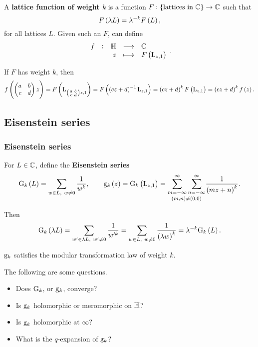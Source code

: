 \begin{definition}
A \textbf{lattice function of weight $ k $} is a function $ F : \cbr{\text{lattices in} \ \CC} \to \CC $ such that
$$ F\br{\lambda L} = \lambda^{-k}F\br{L}, $$
for all lattices $ L $. Given such an $ F $, can define
$$ \function[f]{\HH}{\CC}{z}{F\br{\L_{z, 1}}}. $$
\end{definition}

If $ F $ has weight $ k $, then
$$ f\br{\twobytwo{a}{b}{c}{d}z} = F\br{\L_{\twobytwosmall{a}{b}{c}{d}z, 1}} = F\br{\br{cz + d}^{-1}\L_{z, 1}} = \br{cz + d}^kF\br{\L_{z, 1}} = \br{cz + d}^kf\br{z}. $$

\pagebreak

\subsection{Eisenstein series}

\subsubsection{Eisenstein series}


\begin{definition}
For $ L \in \mathbb{C} $, define the \textbf{Eisenstein series}
$$ \G_k\br{L} = \sum_{w \in L, \ w \ne 0} \dfrac{1}{w^k}, \qquad \g_k\br{z} = \G_k\br{\L_{z, 1}} = \underset{\br{m, n} \ne \br{0, 0}}{\sum_{m = -\infty}^\infty \sum_{n = -\infty}^\infty} \dfrac{1}{\br{mz + n}^k}. $$
\end{definition}

Then
$$ \G_k\br{\lambda L} = \sum_{w' \in \lambda L, \ w' \ne 0} \dfrac{1}{w'^k} = \sum_{w \in L, \ w \ne 0} \dfrac{1}{\br{\lambda w}^k} = \lambda^{-k}\G_k\br{L}. $$

\begin{corollary}
$ \mathrm{g}_k $ satisfies the modular transformation law of weight $ k $.
\end{corollary}

The following are some questions.
\begin{itemize}
\item Does $ \mathrm{G}_k $, or $ \mathrm{g}_k $, converge?
\item Is $ \mathrm{g}_k $ holomorphic or meromorphic on $ \mathbb{H} $?
\item Is $ \mathrm{g}_k $ holomorphic at $ \infty $?
\item What is the $ q $-expansion of $ \mathrm{g}_k $?
\end{itemize}

